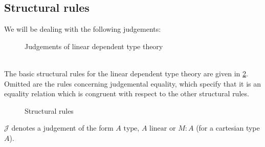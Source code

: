 \subsection{Structural rules}
We will be dealing with the following judgements:\\
\begin{figure}[h]
\caption{Judgements of linear dependent type theory}
\label{judgements}
\end{figure}
\\
The basic structural rules for the linear dependent type theory are given in \ref{struc}. Omitted are the rules concerning judgemental equality, which specify that it is an equality relation which is congruent with respect to the other structural rules.
\begin{figure}[H]
  \centering
  
  \caption{Structural rules}
  \label{struc}
\end{figure}
$\mathcal{J}$ denotes a judgement of the form $A \text{ type}$, $A \text{ linear}$ or $M : A$ (for a cartesian type $A$).
